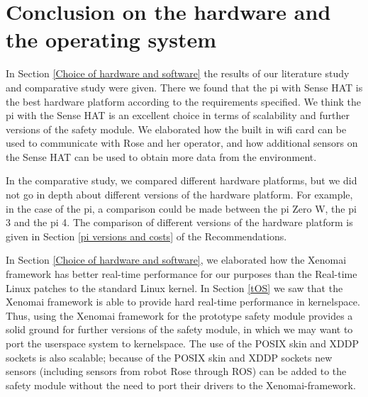 \documentclass[12pt]{scrreprt}
\begin{document}
\section{Conclusion on the hardware and the operating system}
In Section \ref{Choice of hardware and software} the results of our literature study and comparative study were given. There we found that the \gls{pi} with Sense HAT is the best hardware platform according to the requirements specified. We think the \gls{pi} with the Sense HAT is an excellent choice in terms of scalability and further versions of the safety module. We elaborated how the built in \gls{wifi} card can be used to communicate with Rose and her operator, and how additional sensors on the Sense HAT can be used to obtain more data from the environment.
\par
In the comparative study, we compared different hardware platforms, but we did not go in depth about different versions of the hardware platform. For example, in the case of the \gls{pi}, a comparison could be made between the \gls{pi} Zero W, the \gls{pi} 3 and the \gls{pi} 4. The comparison of different versions of the hardware platform is given in Section \ref{pi versions and costs}  of the Recommendations.
\par
In Section \ref{Choice of hardware and software}, we elaborated how the Xenomai framework has better real-time performance for our purposes than the Real-time Linux patches to the standard Linux kernel. In Section \ref{tOS} we saw that the Xenomai framework is able to provide hard real-time performance in kernelspace. Thus, using the Xenomai framework for the prototype safety module provides a solid ground for further versions of the safety module, in which we may want to port the userspace system to kernelspace. The use of the POSIX skin and XDDP sockets is also scalable; because of the POSIX skin and XDDP sockets new sensors (including sensors from robot Rose through ROS) can be added to the safety module without the need to port their drivers to the Xenomai-framework.
\end{document}
